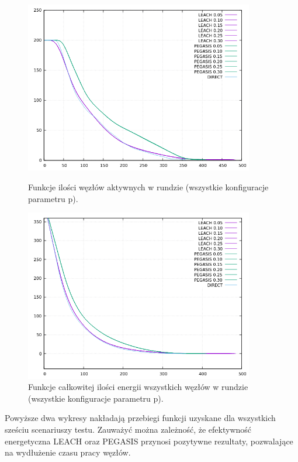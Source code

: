 \documentclass[a4paper,12pt,twoside,openany]{report}
\begin{document}
\begin{figure}[H]
 \centering
 \includegraphics[width=10cm]{images/gnuplot/test_4/nodes_in_round_all.png}
 \caption{Funkcje ilości węzłów aktywnych w rundzie (wszystkie konfiguracje parametru p).}
 \includegraphics[width=10cm]{images/gnuplot/test_4/energy_in_round_all.png}
 \caption{Funkcje całkowitej ilości energii wszystkich węzłów w rundzie (wszystkie konfiguracje parametru p).}
\end{figure}

\par
Powyższe dwa wykresy nakładają przebiegi funkcji uzyskane dla wszystkich sześciu scenariuszy testu.
Zauważyć można zależność, że efektywność energetyczna LEACH oraz PEGASIS przynosi pozytywne rezultaty, pozwalające na wydłużenie czasu pracy węzłów.
\end{document}
